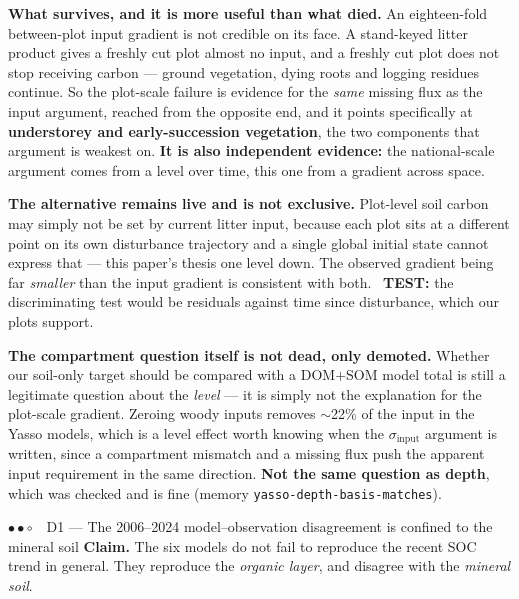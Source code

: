 \documentclass[11pt]{article}
\newcommand{\stB}{\textcolor{stmid}{$\bullet\bullet\circ$}}     %
\newcommand{\sinput}{\sigma_{\mathrm{input}}}
\begin{document}
\medskip\noindent\textbf{What survives, and it is more useful than what died.} An eighteen-fold
between-plot input gradient is not credible on its face. A stand-keyed litter product gives a freshly
cut plot almost no input, and a freshly cut plot does not stop receiving carbon --- ground vegetation,
dying roots and logging residues continue. So the plot-scale failure is evidence for the \emph{same}
missing flux as the input argument, reached from the opposite end, and it points specifically at
\textbf{understorey and early-succession vegetation}, the two components that argument is weakest on.
\textbf{It is also independent evidence:} the national-scale argument comes from a level over time,
this one from a gradient across space.

\begin{caveat}
\textbf{The alternative remains live and is not exclusive.} Plot-level soil carbon may simply not be
set by current litter input, because each plot sits at a different point on its own disturbance
trajectory and a single global initial state cannot express that --- this paper's thesis one level
down. The observed gradient being far \emph{smaller} than the input gradient is consistent with both.
\ \textbf{TEST:} the discriminating test would be residuals against time since disturbance, which our plots
support.
\end{caveat}

\begin{caveat}
\textbf{The compartment question itself is not dead, only demoted.} Whether our soil-only target
should be compared with a DOM${+}$SOM model total is still a legitimate question about the
\emph{level} --- it is simply not the explanation for the plot-scale gradient. Zeroing woody inputs
removes $\sim$22\% of the input in the Yasso models, which is a level effect worth knowing when the
$\sinput$ argument is written, since a compartment mismatch and a missing flux push the apparent input
requirement in the same direction. \textbf{Not the same question as depth}, which was checked and is
fine (memory \texttt{yasso-depth-basis-matches}).
\end{caveat}

\begin{finding}{\stB\ \ D1 --- The 2006--2024 model--observation disagreement is confined to the mineral soil}
\textbf{Claim.} The six models do not fail to reproduce the recent SOC trend in general.
They reproduce the \emph{organic layer}, and disagree with the \emph{mineral soil}.
\end{finding}
\end{document}
